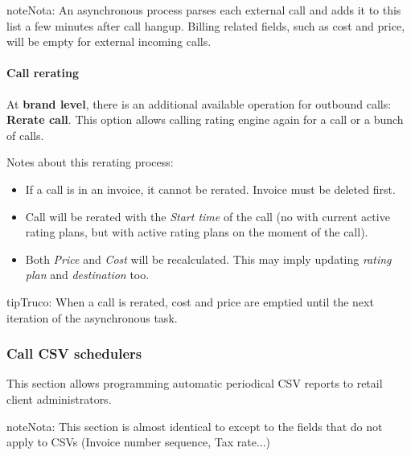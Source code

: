 \documentclass[letterpaper,10pt,spanish]{sphinxmanual}
\begin{document}
\begin{notice}{note}{Nota:}
An asynchronous process parses each external call and adds it to this list a few minutes after call hangup. Billing related fields, such as cost and price, will be empty for external incoming calls.
\end{notice}


\paragraph{Call rerating}
\label{administration_portal/client/retail/calls/external_calls:call-rerating}
At \textbf{brand level}, there is an additional available operation for outbound calls: \textbf{Rerate call}. This option allows calling rating engine again for a call or a bunch of calls.

Notes about this rerating process:
\begin{itemize}
\item {} 
If a call is in an invoice, it cannot be rerated. Invoice must be deleted first.

\item {} 
Call will be rerated with the \emph{Start time} of the call (no with current active rating plans, but with active rating plans
on the moment of the call).

\item {} 
Both \emph{Price} and \emph{Cost} will be recalculated. This may imply updating \emph{rating plan} and \emph{destination} too.

\end{itemize}

\begin{notice}{tip}{Truco:}
When a call is rerated, cost and price are emptied until the next iteration of the asynchronous task.
\end{notice}


\subsubsection{Call CSV schedulers}
\label{administration_portal/client/retail/calls/call_csv_schedulers:call-csv-schedulers}\label{administration_portal/client/retail/calls/call_csv_schedulers::doc}
This section allows programming automatic periodical CSV reports to retail client administrators.

\begin{notice}{note}{Nota:}
This section is almost identical to {\hyperref[administration_portal/brand/invoicing/invoice_schedulers:invoice\string-schedulers]{}} except to the
fields that do not apply to CSVs (Invoice number sequence, Tax rate...)
\end{notice}
\end{document}
